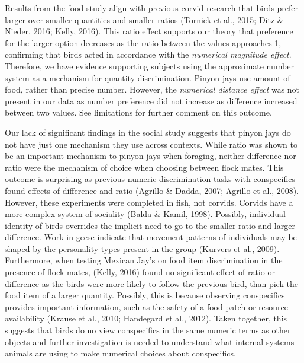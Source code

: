 \documentclass[
  english,
  ,doc,floatsintext]{apa6}
\begin{document}
Results from the food study align with previous corvid research that birds prefer larger over smaller quantities and smaller ratios (Tornick et al., 2015; Ditz \& Nieder, 2016; Kelly, 2016). This ratio effect supports our theory that preference for the larger option decreases as the ratio between the values approaches 1, confirming that birds acted in accordance with the \emph{numerical magnitude effect}. Therefore, we have evidence supporting subjects using the approximate number system as a mechanism for quantity discrimination. Pinyon jays use amount of food, rather than precise number. However, the \emph{numerical distance effect} was not present in our data as number preference did not increase as difference increased between two values. See limitations for further comment on this outcome.

Our lack of significant findings in the social study suggests that pinyon jays do not have just one mechanism they use across contexts. While ratio was shown to be an important mechanism to pinyon jays when foraging, neither difference nor ratio were the mechanism of choice when choosing between flock mates. This outcome is surprising as previous numeric discrimination tasks with conspecifics found effects of difference and ratio (Agrillo \& Dadda, 2007; Agrillo et al., 2008). However, these experiments were completed in fish, not corvids. Corvids have a more complex system of sociality (Balda \& Kamil, 1998). Possibly, individual identity of birds overrides the implicit need to go to the smaller ratio and larger difference. Work in geese indicate that movement patterns of individuals may be shaped by the personality types present in the group (Kurvers et al., 2009). Furthermore, when testing Mexican Jay's on food item discrimination in the presence of flock mates, (Kelly, 2016) found no significant effect of ratio or difference as the birds were more likely to follow the previous bird, than pick the food item of a larger quantity. Possibly, this is because observing conspecifics provides important information, such as the safety of a food patch or resource availability (Krause et al., 2010; Handegard et al., 2012). Taken together, this suggests that birds do no view conspecifics in the same numeric terms as other objects and further investigation is needed to understand what internal systems animals are using to make numerical choices about conspecifics.
\end{document}
